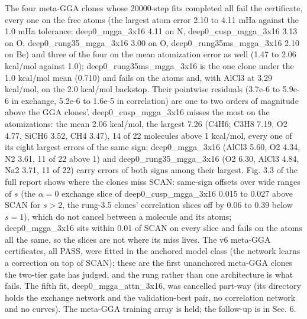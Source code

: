 \documentclass[10pt,a4paper]{article}
\begin{document}
The four meta-GGA clones whose 20000-step fits completed all fail the certificate, every one on the free atoms (the largest atom error 2.10 to 4.11 mHa against the 1.0 mHa tolerance: deep0\_mgga\_3x16 4.11 on N, deep0\_cusp\_mgga\_3x16 3.13 on O, deep0\_rung35\_mgga\_3x16 3.00 on O, deep0\_rung35ms\_mgga\_3x16 2.10 on Be) and three of the four on the mean atomization error as well (1.47 to 2.06 kcal/mol against 1.0); deep0\_rung35ms\_mgga\_3x16 is the one clone under the 1.0 kcal/mol mean (0.710) and fails on the atoms and, with AlCl3 at 3.29 kcal/mol, on the 2.0 kcal/mol backstop. Their pointwise residuals (3.7e-6 to 5.9e-6 in exchange, 5.2e-6 to 1.6e-5 in correlation) are one to two orders of magnitude above the GGA clones'. deep0\_cusp\_mgga\_3x16 misses the most on the atomizations: the mean 2.06 kcal/mol, the largest 7.26 (C4H6; C3H8 7.19, O2 4.77, SiCH6 3.52, CH4 3.47), 14 of 22 molecules above 1 kcal/mol, every one of its eight largest errors of the same sign; deep0\_mgga\_3x16 (AlCl3 5.60, O2 4.34, N2 3.61, 11 of 22 above 1) and deep0\_rung35\_mgga\_3x16 (O2 6.30, AlCl3 4.84, Na2 3.71, 11 of 22) carry errors of both signs among their largest. Fig. 3.3 of the full report shows where the clones miss SCAN: same-sign offsets over wide ranges of $s$ (the $\alpha = 0$ exchange slice of deep0\_cusp\_mgga\_3x16 0.015 to 0.027 above SCAN for $s > 2$, the rung-3.5 clones' correlation slices off by 0.06 to 0.39 below $s = 1$), which do not cancel between a molecule and its atoms; deep0\_mgga\_3x16 sits within 0.01 of SCAN on every slice and fails on the atoms all the same, so the slices are not where its miss lives. The v6 meta-GGA certificates, all PASS, were fitted in the anchored model class (the network learns a correction on top of SCAN); these are the first unanchored meta-GGA clones the two-tier gate has judged, and the rung rather than one architecture is what fails. The fifth fit, deep0\_mgga\_attn\_3x16, was cancelled part-way (its directory holds the exchange network and the validation-best pair, no correlation network and no curves). The meta-GGA training array is held; the follow-up is in Sec. 6.
\end{document}
